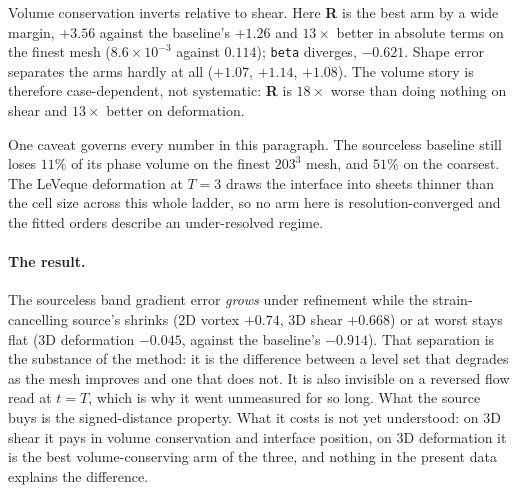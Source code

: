\documentclass[preprint,3p,11pt]{elsarticle}
\begin{document}
Volume conservation inverts relative to shear. Here \textbf{R} is the best arm
by a wide margin, $+3.56$ against the baseline's $+1.26$ and $13\times$ better
in absolute terms on the finest mesh ($8.6\times10^{-3}$ against $0.114$);
\texttt{beta} diverges, $-0.621$. Shape error separates the arms hardly at all
($+1.07$, $+1.14$, $+1.08$). The volume story is therefore case-dependent, not
systematic: \textbf{R} is $18\times$ worse than doing nothing on shear and
$13\times$ better on deformation.

One caveat governs every number in this paragraph. The sourceless baseline
still loses $11\%$ of its phase volume on the finest $203^3$ mesh, and $51\%$ on
the coarsest. The LeVeque deformation at $T=3$ draws the interface into sheets
thinner than the cell size across this whole ladder, so no arm here is
resolution-converged and the fitted orders describe an under-resolved regime.

\paragraph{The result.}
The sourceless band gradient error \emph{grows} under refinement while the
strain-cancelling source's shrinks (2D vortex $+0.74$, 3D shear $+0.668$) or at
worst stays flat (3D deformation $-0.045$, against the baseline's $-0.914$).
That separation is the substance of the method: it is the difference between a
level set that degrades as the mesh improves and one that does not. It is also
invisible on a reversed flow read at $t=T$, which is why it went unmeasured for
so long. What the source buys is the signed-distance property. What it costs is
not yet understood: on 3D shear it pays in volume conservation and interface
position, on 3D deformation it is the best volume-conserving arm of the three,
and nothing in the present data explains the difference.
\end{document}
